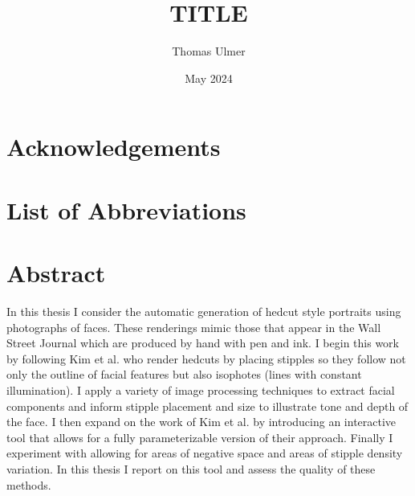 \documentclass[12pt,twoside]{reedthesis}
\title{TITLE}
\author{Thomas Ulmer}
\date{May 2024}
\begin{document}
  \maketitle
  \frontmatter %
  \pagestyle{empty} %

    \chapter*{Acknowledgements}





    \chapter*{List of Abbreviations}


    \tableofcontents
    \listoffigures

    \chapter*{Abstract}
        In this thesis I consider the automatic generation of hedcut style portraits using photographs of faces. These renderings mimic those that appear in the Wall Street Journal which are produced by hand with pen and ink. I begin this work by following Kim et al. who render hedcuts by placing stipples so they follow not only the outline of facial features but also isophotes (lines with constant illumination). I apply a variety of image processing techniques to extract facial components and inform stipple placement and size to illustrate tone and depth of the face. I then expand on the work of Kim et al. by introducing an interactive tool that allows for a fully parameterizable version of their approach. Finally I experiment with allowing for areas of negative space and areas of stipple density variation. In this thesis I report on this tool and assess the quality of these methods.
\end{document}
